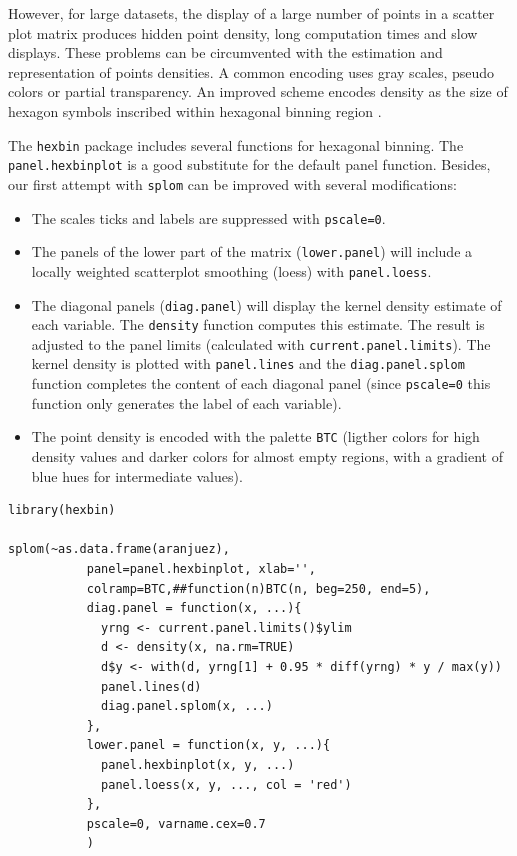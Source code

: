 However, for large datasets, the display of a large number of
points in a scatter plot matrix produces hidden point density,
long computation times and slow displays. These problems can be
circumvented with the estimation and representation of points
densities.  A common encoding uses gray scales, pseudo colors or
partial transparency. An improved scheme encodes density as the
size of hexagon symbols inscribed within hexagonal binning region
\cite{Carr.Littlefield.ea1987}.

The \texttt{hexbin} package includes several functions for hexagonal
binning.  The \texttt{panel.hexbinplot} is a good substitute for the
default panel function. Besides, our first attempt with \texttt{splom}
can be improved with several modifications:
\begin{itemize}
\item The scales ticks and labels are suppressed with \texttt{pscale=0}.
\item The panels of the lower part of the matrix (\texttt{lower.panel}) will include a
  locally weighted scatterplot smoothing (loess) with
  \texttt{panel.loess}.
\item The diagonal panels (\texttt{diag.panel}) will display the kernel
  density estimate of each variable. The \texttt{density} function
  computes this estimate. The result is adjusted to the panel
  limits (calculated with \texttt{current.panel.limits}). The kernel
  density is plotted with \texttt{panel.lines} and the \texttt{diag.panel.splom}
  function completes the content of each diagonal panel (since
  \texttt{pscale=0} this function only generates the label of each variable).
\item The point density is encoded with the palette \texttt{BTC} (ligther
  colors for high density values and darker colors for almost
  empty regions, with a gradient of blue hues for intermediate values).
\end{itemize}


\lstset{language=R}
\begin{lstlisting}
library(hexbin)

splom(~as.data.frame(aranjuez),
           panel=panel.hexbinplot, xlab='',
           colramp=BTC,##function(n)BTC(n, beg=250, end=5),
           diag.panel = function(x, ...){
             yrng <- current.panel.limits()$ylim
             d <- density(x, na.rm=TRUE)
             d$y <- with(d, yrng[1] + 0.95 * diff(yrng) * y / max(y))
             panel.lines(d)
             diag.panel.splom(x, ...)
           },
           lower.panel = function(x, y, ...){
             panel.hexbinplot(x, y, ...)
             panel.loess(x, y, ..., col = 'red')
           },
           pscale=0, varname.cex=0.7
           )
\end{lstlisting}

